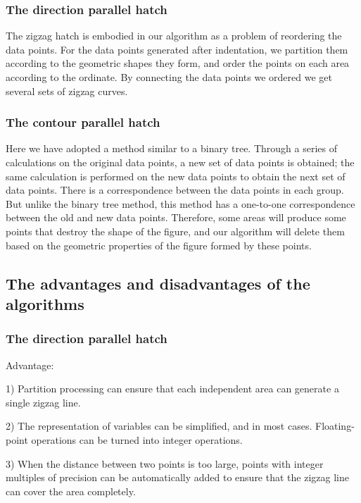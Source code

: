 \documentclass{apmcmthesis}
\begin{document}
\subsubsection{The direction parallel hatch}

The zigzag hatch is embodied in our algorithm as a problem of reordering the data points. For the data points generated after indentation, we partition them according to the geometric shapes they form, and order the points on each area according to the ordinate. By connecting the data points we ordered we get several sets of zigzag curves.

\subsubsection{The contour parallel hatch}

Here we have adopted a method similar to a binary tree. Through a series of calculations on the original data points, a new set of data points is obtained; the same calculation is performed on the new data points to obtain the next set of data points. There is a correspondence between the data points in each group. But unlike the binary tree method, this method has a one-to-one correspondence between the old and new data points. Therefore, some areas will produce some points that destroy the shape of the figure, and our algorithm will delete them based on the geometric properties of the figure formed by these points.

\subsection{The advantages and disadvantages of the algorithms}

\subsubsection{The direction parallel hatch}

Advantage:


1) Partition processing can ensure that each independent area can generate a single zigzag line.


2) The representation of variables can be simplified, and in most cases. Floating-point operations can be turned into integer operations.


3) When the distance between two points is too large, points with integer multiples of precision can be automatically added to ensure that the zigzag line can cover the area completely.
\end{document}
